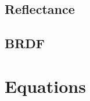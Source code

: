 \documentclass{article}
\begin{document}
\subsection{Reflectance}

\subsection{BRDF}







\section{Equations}



\end{document}
